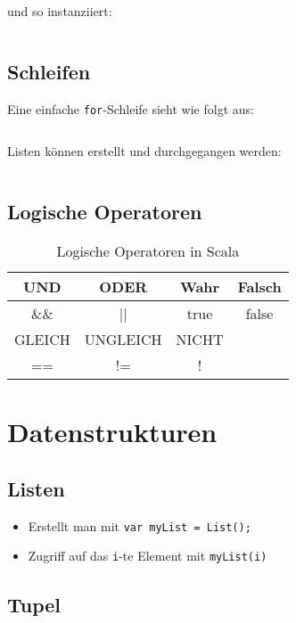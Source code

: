 und so instanziiert:
\inputminted[numbersep=5pt, tabsize=4]{scala}{scripts/scala/simple-class-instanciation.scala}

\subsection{Schleifen}
Eine einfache \texttt{for}-Schleife sieht wie folgt aus:

\inputminted[numbersep=5pt, tabsize=4]{scala}{scripts/scala/extended-for.scala}

Listen können erstellt und durchgegangen werden:

\inputminted[numbersep=5pt, tabsize=4]{scala}{scripts/scala/extended-for.scala}

\subsection{Logische Operatoren}
\begin{table}[H]
    \centering 
    \begin{tabular}{CCCC}
    UND    & ODER     & Wahr  & Falsch \\ \hline\hline
    \&\&   & ||       & true  & false \\[4ex]
    GLEICH & UNGLEICH & NICHT & ~     \\ \hline\hline
    ==     & !=       & !     & ~     \\ 
    \end{tabular}
    \caption{Logische Operatoren in Scala}
\end{table}

\section{Datenstrukturen}
\subsection{Listen}

\begin{itemize}
    \item Erstellt man mit \verb+var myList = List();+
    \item Zugriff auf das \verb+i+-te Element mit \verb+myList(i)+
\end{itemize}

\subsection{Tupel}

